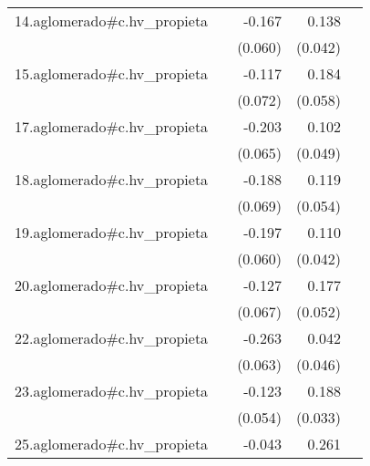 {\begin{longtable}{l*{4}{D{.}{.}{-1}}}
\addlinespace
14.aglomerado#c.hv\_propieta&                     &      -0.167\sym{**} &       0.138\sym{**} &                     \\
            &                     &     (0.060)         &     (0.042)         &                     \\
\addlinespace
15.aglomerado#c.hv\_propieta&                     &      -0.117         &       0.184\sym{**} &                     \\
            &                     &     (0.072)         &     (0.058)         &                     \\
\addlinespace
17.aglomerado#c.hv\_propieta&                     &      -0.203\sym{**} &       0.102\sym{*}  &                     \\
            &                     &     (0.065)         &     (0.049)         &                     \\
\addlinespace
18.aglomerado#c.hv\_propieta&                     &      -0.188\sym{**} &       0.119\sym{*}  &                     \\
            &                     &     (0.069)         &     (0.054)         &                     \\
\addlinespace
19.aglomerado#c.hv\_propieta&                     &      -0.197\sym{***}&       0.110\sym{**} &                     \\
            &                     &     (0.060)         &     (0.042)         &                     \\
\addlinespace
20.aglomerado#c.hv\_propieta&                     &      -0.127         &       0.177\sym{***}&                     \\
            &                     &     (0.067)         &     (0.052)         &                     \\
\addlinespace
22.aglomerado#c.hv\_propieta&                     &      -0.263\sym{***}&       0.042         &                     \\
            &                     &     (0.063)         &     (0.046)         &                     \\
\addlinespace
23.aglomerado#c.hv\_propieta&                     &      -0.123\sym{*}  &       0.188\sym{***}&                     \\
            &                     &     (0.054)         &     (0.033)         &                     \\
\addlinespace
25.aglomerado#c.hv\_propieta&                     &      -0.043         &       0.261\sym{***}&                     \\

\end{longtable}}
